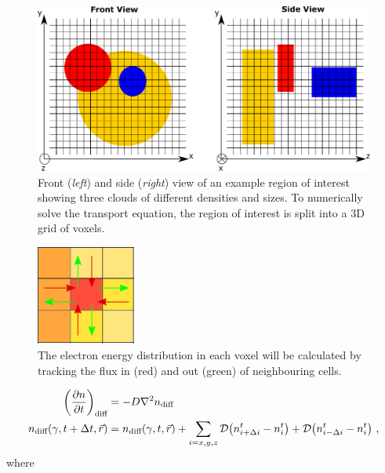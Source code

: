 \begin{figure}[h!]
	\centering
	\includegraphics[width=\textwidth]{09_Multizone/Images/code/cartesian.pdf}
	\caption{Front (\textit{left}) and side (\textit{right}) view of an example region of interest showing three clouds of different densities and sizes. To numerically solve the transport equation, the region of interest is split into a 3D grid of voxels.}
	\label{fig:chapter_8_multizone_cartesian}
\end{figure}
\begin{figure}
	\centering
	\includegraphics[width=0.29\textwidth]{09_Multizone/Images/code/transport.pdf}
	\caption{The electron energy distribution in each voxel will be calculated by tracking the flux in (red) and out (green) of neighbouring cells.}
	\label{eq:09_transport_cells}
\end{figure}
\begin{equation}
    \begin{aligned}
        \qty(\pdv{n}{t})_\text{diff}
        &= -D\nabla^2 n_\text{diff} \\
        n_\text{diff}\qty(\gamma,t+\Delta t,\vec{r})&=n_\text{diff}\qty(\gamma,t,\vec{r})+\sum_{i=x,y,z} \mathcal{D}
        \qty(n_{i+\Delta i}^{t}
        -n_{i}^t)
        +\mathcal{D}
        \qty(n_{i-\Delta i}^t
        -n_i^t) \text{ ,} 
    \end{aligned} \label{eq:chapter_8_multizone_diff_numerical_sol}
\end{equation}
\noindent where
